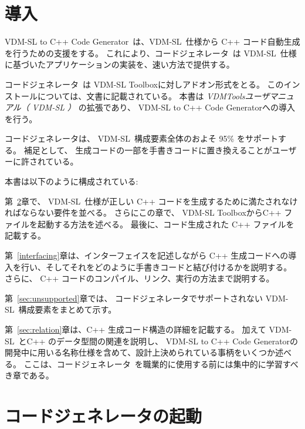 \documentclass[\pformat,12pt]{jarticle}
\newcommand{\ToolboxName}{VDM-SL Toolbox}
\newcommand{\toolbox}{Toolbox}
\begin{document}


\newcommand{\tcg}{コードジェネレータ}
\newcommand{\Tcg}{コードジェネレータ}


\newcommand{\libmancite}{\cite{LibMan-SCSK}}
\newcommand{\langmancite}{\cite{LangMan-SCSK}}
\newcommand{\cg}{VDM-SL to C++ Code Generator}
\newcommand{\MCL}{VDM C++ Library}
\newcommand{\VDM}{VDM-SL}


\section{導入}


\cg\ は、\VDM\ 仕様から C++ コード自動生成を行うための支援をする。
これにより、\tcg\ は \VDM\ 仕様に基づいたアプリケーションの実装を、速い方法で提供する。

 \Tcg\ は \ToolboxName{}に対しアドオン形式をとる。
このインストールについては、文書に記載されている。
本書は {\em VDMToolsユーザマニュアル（ \VDM{} ）} の拡張であり、 \cg{}への導入を行う。

コードジェネレータは、 \VDM\ 構成要素全体のおよそ 95\% をサポートする。
補足として、 生成コードの一部を手書きコードに置き換えることがユーザーに許されている。

本書は以下のように構成されている:

第~\ref{invoking}章で、 \VDM\ 仕様が正しい C++ コードを生成するために満たされなければならない要件を並べる。
さらにこの章で、 \ToolboxName{}からC++ ファイルを起動する方法を述べる。
最後に、コード生成された C++ ファイルを記載する。

第~\ref{interfacing}章は、インターフェイスを記述しながら C++ 生成コードへの導入を行い、そしてそれをどのように手書きコードと結び付けるかを説明する。
さらに、 C++ コードのコンパイル、リンク、実行の方法まで説明する。

第~\ref{sec:unsupported}章では、 \tcg{}でサポートされない \VDM\ 構成要素をまとめて示す。

第~\ref{sec:relation}章は、C++ 生成コード構造の詳細を記載する。
加えて \VDM\ とC++ のデータ型間の関連を説明し、 \cg{}の開発中に用いる名称仕様を含めて、設計上決められている事柄をいくつか述べる。
ここは、\tcg\ を職業的に使用する前には集中的に学習すべき章である。


\section{コードジェネレータの起動}\label{invoking}
\end{document}
